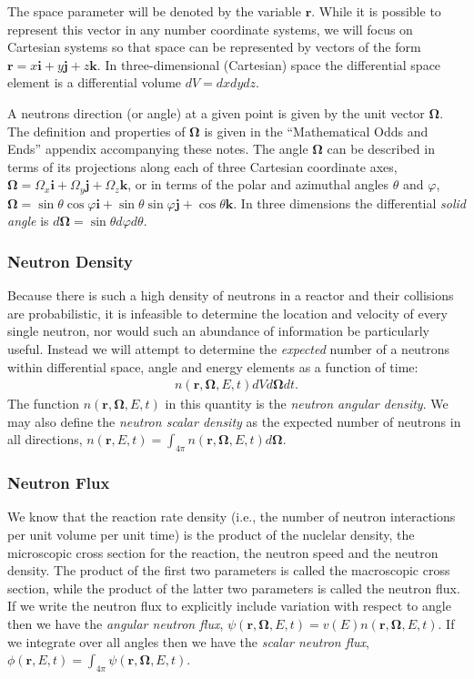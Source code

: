 \documentclass[11pt]{article}
\renewcommand\vec{\mathbf}
\begin{document}
The space parameter will be denoted by the variable \(\vec{r}\).  While it is possible to represent this vector in any number coordinate systems, we will focus on Cartesian systems so that space can be represented by vectors of the form \(\vec{r} = x\vec{i} + y\vec{j} + z \vec{k}\).  In three-dimensional (Cartesian) space the differential space element is a differential volume \(dV = dx dy dz\).

A neutrons direction (or angle) at a given point is given by the unit vector \(\vec{\Omega}\).  The definition and properties of \(\vec{\Omega}\) is given in the ``Mathematical Odds and Ends'' appendix accompanying these notes.  The angle \(\vec{\Omega}\) can be described in terms of its projections along each of three Cartesian coordinate axes, \(\vec{\Omega} = \Omega_x \vec{i} + \Omega_y \vec{j} + \Omega_z \vec{k}\), or in terms of the polar and azimuthal angles \(\theta\) and \(\varphi\), \(\vec{\Omega} = \sin\theta \cos\varphi \vec{i} + \sin\theta \sin\varphi \vec{j} + \cos\theta \vec{k}\).  In three dimensions the differential \emph{solid angle} is \(d\vec{\Omega} = \sin\theta d\varphi d\theta\).

\subsubsection{Neutron Density}
\label{sec:orgheadline42}
Because there is such a high density of neutrons in a reactor and their collisions are probabilistic, it is infeasible to determine the location and velocity of every single neutron, nor would such an abundance of information be particularly useful.  Instead we will attempt to determine the \emph{expected} number of a neutrons within differential space, angle and energy elements as a function of time:
\begin{align}
  n(\vec{r},\vec{\Omega},E,t) dV d\vec{\Omega} dt.
\end{align}
The function \(n(\vec{r},\vec{\Omega},E,t)\) in this quantity is the \emph{neutron angular density}.  We may also define the \emph{neutron scalar density} as the expected number of neutrons in all directions, \(n(\vec{r},E,t) = \int_{4\pi} n(\vec{r},\vec{\Omega},E,t) d\vec{\Omega}\).

\subsubsection{Neutron Flux}
\label{sec:orgheadline43}
We know that the reaction rate density (i.e., the number of neutron interactions per unit volume per unit time) is the product of the nuclelar density, the microscopic cross section for the reaction, the neutron speed and the neutron density.  The product of the first two parameters is called the macroscopic cross section, while the product of the latter two parameters is called the neutron flux.  If we write the neutron flux to explicitly include variation with respect to angle then we have the \emph{angular neutron flux}, \(\psi(\vec{r},\vec{\Omega},E,t) = v(E)n(\vec{r},\vec{\Omega},E,t)\).  If we integrate over all angles then we have the \emph{scalar neutron flux}, \(\phi(\vec{r},E,t) = \int_{4\pi} \psi(\vec{r},\vec{\Omega},E,t)\).
\end{document}
